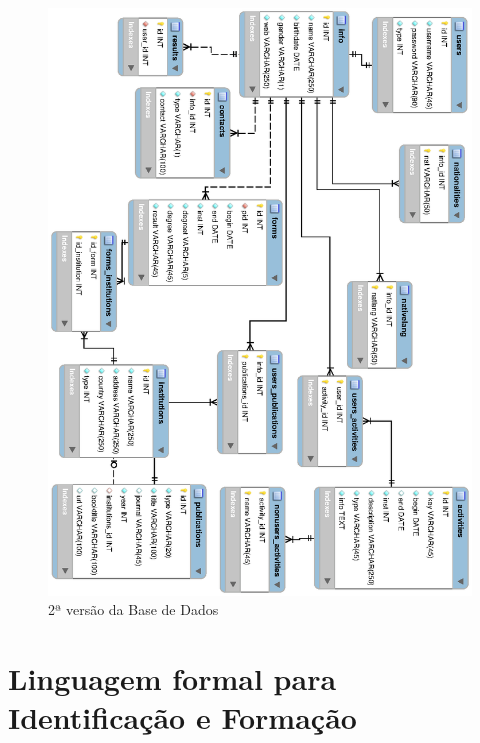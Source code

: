 \documentclass[a4paper,11pt,openright,openbib]{article}
\begin{document}
\begin{figure}[!ht]
\centering
\includegraphics[scale=1]{bd2.eps}
\caption{2ª versão da Base de Dados}
\label{fig:basededados2}
\end{figure}
\section{Linguagem formal para Identificação e Formação}
\end{document}
